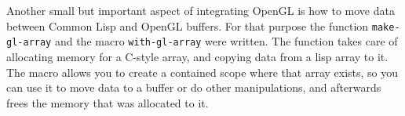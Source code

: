Another small but important aspect of integrating OpenGL is how to move data between Common Lisp and OpenGL buffers.
For that purpose the function \texttt{make-gl-array} and the macro \texttt{with-gl-array} were written.
The function takes care of allocating memory for a C-style array,
and copying data from a lisp array to it.
The macro allows you to create a contained scope where that array exists,
so you can use it to move data to a buffer or do other manipulations,
and afterwards frees the memory that was allocated to it.

